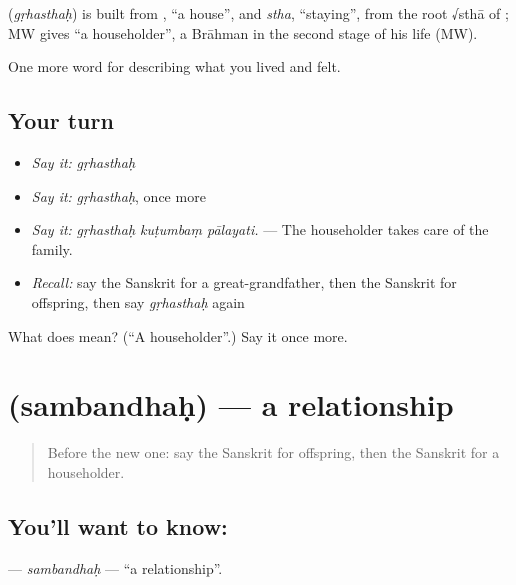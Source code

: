 \begin{cousinweb}
\textbf{} (\emph{gṛhasthaḥ}) is built from \textbf{}, \textquotedblleft{}a house\textquotedblright{}, and \emph{stha}, \textquotedblleft{}staying\textquotedblright{}, from the root √sthā of \textbf{}; MW gives \textquotedblleft{}a householder\textquotedblright{}, a Brāhman in the second stage of his life (MW).
\end{cousinweb}

\begin{grammarlens}[title={What you've built}]
One more word for describing what you lived and felt.
\end{grammarlens}

\subsection*{Your turn}
\begin{itemize}
\raggedright
  \item \emph{Say it:} \emph{gṛhasthaḥ}
  \item \emph{Say it:} \emph{gṛhasthaḥ}, once more
  \item \emph{Say it:} \emph{gṛhasthaḥ kuṭumbaṃ pālayati.} — The householder takes care of the family.
  \item \emph{Recall:} say the Sanskrit for a great-grandfather, then the Sanskrit for offspring, then say \emph{gṛhasthaḥ} again
\end{itemize}

\begin{tcolorbox}[breakable,colback=teal!4,colframe=teal!35!black,title={Before you move on}]
What does  mean? (\textquotedblleft{}A householder\textquotedblright{}.) Say it once more.
\end{tcolorbox}
\section[\texorpdfstring{\sk{सम्बन्धः} (sambandhaḥ)}{सम्बन्धः (sambandhaḥ)}]{ (sambandhaḥ) — a relationship}

\label{lesson:SA-C501-sambandhah}



\begin{quote}
Before the new one: say the Sanskrit for offspring, then the Sanskrit for a householder.
\end{quote}

\subsection*{You'll want to know: }
\textbf{} — \emph{sambandhaḥ} — \textquotedblleft{}a relationship\textquotedblright{}.

